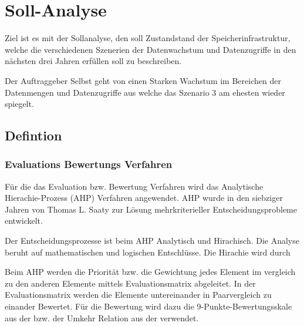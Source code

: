 
\cleardoublepage
\chapter{Soll-Analyse}
Ziel ist es mit der Sollanalyse, den soll Zustandstand der Speicherinfrastruktur, welche die verschiedenen Szenerien der Datenwachstum und Datenzugriffe in den nächsten drei Jahren erfüllen soll zu beschreiben. 

Der Auftraggeber Selbst geht von einen Starken Wachstum im Bereichen der Datenmengen und Datenzugriffe aus welche das Szenario 3 am ehesten wieder spiegelt.

\section{Defintion}
\subsection{Evaluations Bewertungs Verfahren}
Für die das Evaluation bzw. Bewertung Verfahren wird das Analytische Hierachie-Prozess (AHP) Verfahren angewendet. AHP wurde in den siebziger Jahren von Thomas L. Saaty zur Lösung mehrkriterieller Entscheidungsprobleme entwickelt.

Der Entscheidungsprozesse ist beim AHP Analytisch und Hirachisch. Die Analyse beruht auf mathematischen und logischen Entschlüsse. Die Hirachie wird durch

Beim AHP werden die Priorität bzw. die Gewichtung jedes Element im vergleich zu den anderen Elemente mittels Evaluationsmatrix abgeleitet. In der Evaluationsmatrix werden die Elemente untereinander in Paarvergleich zu einander Bewertet. Für die Bewertung wird dazu die 9-Punkte-Bewertungsskale aus der  bzw. der Umkehr Relation aus der  verwendet.


